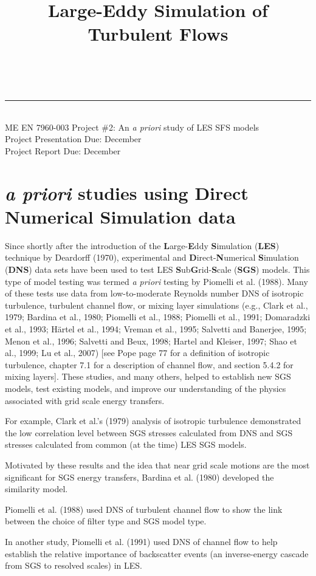 \documentclass[11pt]{article}
\makeatletter
\newcommand{\linia}{\rule{\linewidth}{0.5pt}}
\renewcommand{\maketitle}{
\begin{center}
\vspace{2ex}
{\huge \textsc{\@title}}
\vspace{1ex}
\\
\linia\\
ME EN 7960-003 \hfill Project \#2: An \textit{a priori} study of LES SFS models \\ \hfill Project Presentation Due: December \nth{6}\\\hfill Project Report Due: December \nth{16}
\vspace{4ex}
\end{center}
}
\makeatother
\begin{document}

\title{Large-Eddy Simulation of Turbulent Flows}

\maketitle
\vspace{-20pt}
\section*{\textit{a priori} studies using Direct Numerical Simulation data}
Since shortly after the introduction of the {\bf L}arge-{\bf E}ddy {\bf S}imulation ({\bf LES}) technique by Deardorff (1970), experimental and {\bf D}irect-{\bf N}umerical {\bf S}imulation ({\bf DNS}) data sets have been used to test LES {\bf S}ub{\bf G}rid-{\bf S}cale ({\bf SGS}) models.  This type of model testing was termed {\it a priori} testing by Piomelli et al. (1988).  Many of these tests use data from low-to-moderate Reynolds number DNS of isotropic turbulence, turbulent channel flow, or mixing layer simulations (e.g., Clark et al., 1979; Bardina et al., 1980; Piomelli et al., 1988; Piomelli et al., 1991; Domaradzki et al., 1993; H\"artel et al., 1994; Vreman et al., 1995; Salvetti and Banerjee, 1995;  Menon et al., 1996; Salvetti and Beux, 1998; H\:artel and Kleiser, 1997; Shao et al., 1999; Lu et al., 2007) [see Pope page 77 for a definition of isotropic turbulence, chapter 7.1 for a description of channel flow, and section 5.4.2 for mixing layers]. These studies, and many others, helped to establish new SGS models, test existing models, and improve our understanding of the physics associated with grid scale energy transfers.  

For example, Clark et al.'s (1979) analysis of isotropic turbulence demonstrated the low correlation level between SGS stresses calculated from DNS and SGS stresses calculated from common (at the time) LES SGS models. 

Motivated by these results and the idea that near grid scale motions are the most significant for SGS energy transfers, Bardina et al. (1980) developed the similarity model. 

Piomelli et al. (1988) used DNS of turbulent channel flow to show the link between the choice of filter type and SGS model type. 

In another study, Piomelli et al. (1991) used DNS of channel flow to help establish the relative importance of backscatter events (an inverse-energy cascade from SGS to resolved scales) in LES.  
\end{document}
